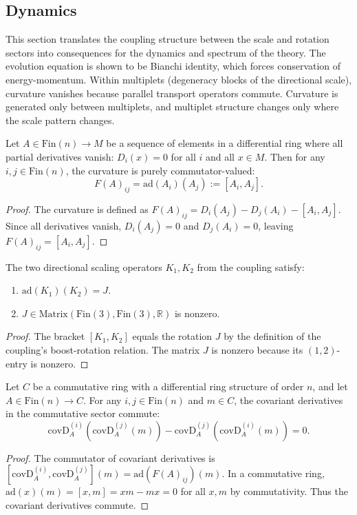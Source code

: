 \subsection{Dynamics}

This section translates the coupling structure between the scale and rotation sectors into consequences for the dynamics and spectrum of the theory. The evolution equation is shown to be Bianchi identity, which forces conservation of energy-momentum. Within multiplets (degeneracy blocks of the directional scale), curvature vanishes because parallel transport operators commute. Curvature is generated only between multiplets, and multiplet structure changes only where the scale pattern changes.

\begin{theorem}
Let $A \in \text{Fin}(n) \to M$ be a sequence of elements in a differential ring where all partial derivatives vanish: $D_i(x) = 0$ for all $i$ and all $x \in M$. Then for any $i, j \in \text{Fin}(n)$, the curvature is purely commutator-valued:
\[
F(A)_{ij} = \text{ad}(A_i)(A_j) := [A_i, A_j].
\]
\begin{proof}
The curvature is defined as $F(A)_{ij} = D_i(A_j) - D_j(A_i) - [A_i, A_j]$. Since all derivatives vanish, $D_i(A_j) = 0$ and $D_j(A_i) = 0$, leaving $F(A)_{ij} = [A_i, A_j]$.
\end{proof}
\end{theorem}

\begin{theorem}
The two directional scaling operators $K_1, K_2$ from the coupling satisfy:
\begin{enumerate}
\item $\text{ad}(K_1)(K_2) = J$.
\item $J \in \text{Matrix}(\text{Fin}(3), \text{Fin}(3), \mathbb{R})$ is nonzero.
\end{enumerate}
\begin{proof}
The bracket $[K_1, K_2]$ equals the rotation $J$ by the definition of the coupling's boost-rotation relation. The matrix $J$ is nonzero because its $(1,2)$-entry is nonzero.
\end{proof}
\end{theorem}

\begin{theorem}
Let $C$ be a commutative ring with a differential ring structure of order $n$, and let $A \in \text{Fin}(n) \to C$. For any $i, j \in \text{Fin}(n)$ and $m \in C$, the covariant derivatives in the commutative sector commute:
\[
\text{covD}_A^{(i)}(\text{covD}_A^{(j)}(m)) - \text{covD}_A^{(j)}(\text{covD}_A^{(i)}(m)) = 0.
\]
\begin{proof}
The commutator of covariant derivatives is $[\text{covD}_A^{(i)}, \text{covD}_A^{(j)}](m) = \text{ad}(F(A)_{ij})(m)$. In a commutative ring, $\text{ad}(x)(m) = [x, m] = xm - mx = 0$ for all $x, m$ by commutativity. Thus the covariant derivatives commute.
\end{proof}
\end{theorem}

